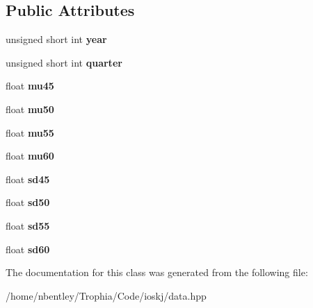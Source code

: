 \subsection*{Public Attributes}
\begin{DoxyCompactItemize}
\item 
\hypertarget{classIOSKJ_1_1Data_1_1ZEstimate_a2511cde8860fc325a4be66a05d806b94}{unsigned short int {\bfseries year}}\label{classIOSKJ_1_1Data_1_1ZEstimate_a2511cde8860fc325a4be66a05d806b94}

\item 
\hypertarget{classIOSKJ_1_1Data_1_1ZEstimate_abc1f796aef34133f4dad711ace3dd529}{unsigned short int {\bfseries quarter}}\label{classIOSKJ_1_1Data_1_1ZEstimate_abc1f796aef34133f4dad711ace3dd529}

\item 
\hypertarget{classIOSKJ_1_1Data_1_1ZEstimate_ab3cf8c05dd916758fcc22c8676473182}{float {\bfseries mu45}}\label{classIOSKJ_1_1Data_1_1ZEstimate_ab3cf8c05dd916758fcc22c8676473182}

\item 
\hypertarget{classIOSKJ_1_1Data_1_1ZEstimate_a49b0106bd644e434504ce8c677bf5d5b}{float {\bfseries mu50}}\label{classIOSKJ_1_1Data_1_1ZEstimate_a49b0106bd644e434504ce8c677bf5d5b}

\item 
\hypertarget{classIOSKJ_1_1Data_1_1ZEstimate_a7728fcde3967717cb8342ca0b0550f5d}{float {\bfseries mu55}}\label{classIOSKJ_1_1Data_1_1ZEstimate_a7728fcde3967717cb8342ca0b0550f5d}

\item 
\hypertarget{classIOSKJ_1_1Data_1_1ZEstimate_af2cdea31b63889b691238a92bca3ce10}{float {\bfseries mu60}}\label{classIOSKJ_1_1Data_1_1ZEstimate_af2cdea31b63889b691238a92bca3ce10}

\item 
\hypertarget{classIOSKJ_1_1Data_1_1ZEstimate_ac6bf29ae6cc8e5b69d21c774b5143937}{float {\bfseries sd45}}\label{classIOSKJ_1_1Data_1_1ZEstimate_ac6bf29ae6cc8e5b69d21c774b5143937}

\item 
\hypertarget{classIOSKJ_1_1Data_1_1ZEstimate_ac04b382296b2422a61d6c6e6ceb28d84}{float {\bfseries sd50}}\label{classIOSKJ_1_1Data_1_1ZEstimate_ac04b382296b2422a61d6c6e6ceb28d84}

\item 
\hypertarget{classIOSKJ_1_1Data_1_1ZEstimate_af38b9264f644528589e2fe18750177b6}{float {\bfseries sd55}}\label{classIOSKJ_1_1Data_1_1ZEstimate_af38b9264f644528589e2fe18750177b6}

\item 
\hypertarget{classIOSKJ_1_1Data_1_1ZEstimate_a19e5b287fb0fa792569a2062c2e63e2b}{float {\bfseries sd60}}\label{classIOSKJ_1_1Data_1_1ZEstimate_a19e5b287fb0fa792569a2062c2e63e2b}

\end{DoxyCompactItemize}


The documentation for this class was generated from the following file\-:\begin{DoxyCompactItemize}
\item 
/home/nbentley/\-Trophia/\-Code/ioskj/data.\-hpp\end{DoxyCompactItemize}
